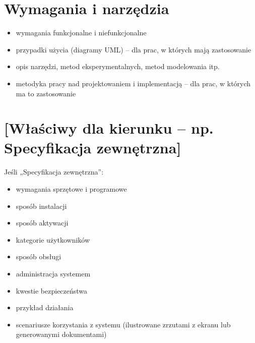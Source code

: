 \documentclass[a4paper,twoside,12pt]{book}
\newtheorem{Definition}{Definicja}
\newtheorem{Example}{Przykład}
\newtheorem{Theorem}{Twierdzenie}
\begin{document}
%
%





\chapter{Wymagania i narzędzia}
\label{ch:wymagania-i-narzedzia}

\begin{itemize}
\item wymagania funkcjonalne i niefunkcjonalne
\item przypadki użycia (diagramy UML) -- dla prac, w których mają zastosowanie
\item opis narzędzi, metod eksperymentalnych, metod modelowania itp.
\item metodyka pracy nad projektowaniem i implementacją -- dla prac, w których ma to zastosowanie
\end{itemize}


\chapter{[Właściwy dla kierunku -- np. Specyfikacja zewnętrzna]}
\label{ch:04}

Jeśli „Specyfikacja zewnętrzna”:
\begin{itemize}
\item  wymagania sprzętowe i programowe
\item  sposób instalacji
\item  sposób aktywacji
\item  kategorie użytkowników
\item  sposób obsługi
\item  administracja systemem
\item  kwestie bezpieczeństwa
\item  przykład działania
\item  scenariusze korzystania z systemu (ilustrowane zrzutami z ekranu lub generowanymi dokumentami)
\end{itemize}
\end{document}
